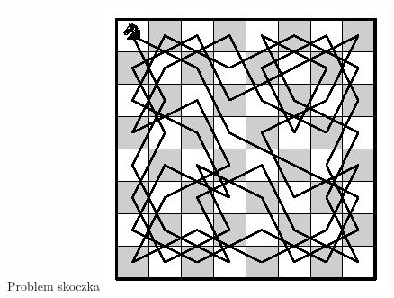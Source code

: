 \begin{frame}{Problem skoczka}
    \centering
    \includegraphics[height=0.8\textheight]{graphics/recursion/knight_tour.jpg}
\end{frame}
